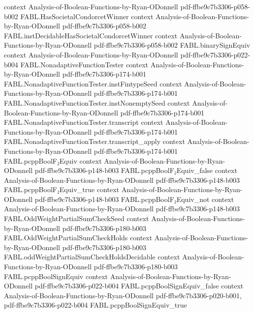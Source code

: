 \begin{theorem}
  {context}
  {Analysis-of-Boolean-Functions-by-Ryan-ODonnell}
  {pdf-ffbe9c7b3306-p058-b002}
\proofstep
  {FABL.HasSocietalCondorcetWinner}
  {context}
  {Analysis-of-Boolean-Functions-by-Ryan-ODonnell}
  {pdf-ffbe9c7b3306-p058-b002}
\proofstep
  {FABL.instDecidableHasSocietalCondorcetWinner}
  {context}
  {Analysis-of-Boolean-Functions-by-Ryan-ODonnell}
  {pdf-ffbe9c7b3306-p058-b002}
\proofstep
  {FABL.binarySignEquiv}
  {context}
  {Analysis-of-Boolean-Functions-by-Ryan-ODonnell}
  {pdf-ffbe9c7b3306-p022-b004}
\proofstep
  {FABL.NonadaptiveFunctionTester}
  {context}
  {Analysis-of-Boolean-Functions-by-Ryan-ODonnell}
  {pdf-ffbe9c7b3306-p174-b001}
\proofstep
  {FABL.NonadaptiveFunctionTester.instFintypeSeed}
  {context}
  {Analysis-of-Boolean-Functions-by-Ryan-ODonnell}
  {pdf-ffbe9c7b3306-p174-b001}
\proofstep
  {FABL.NonadaptiveFunctionTester.instNonemptySeed}
  {context}
  {Analysis-of-Boolean-Functions-by-Ryan-ODonnell}
  {pdf-ffbe9c7b3306-p174-b001}
\proofstep
  {FABL.NonadaptiveFunctionTester.transcript}
  {context}
  {Analysis-of-Boolean-Functions-by-Ryan-ODonnell}
  {pdf-ffbe9c7b3306-p174-b001}
\proofstep
  {FABL.NonadaptiveFunctionTester.transcript_apply}
  {context}
  {Analysis-of-Boolean-Functions-by-Ryan-ODonnell}
  {pdf-ffbe9c7b3306-p174-b001}
\proofstep
  {FABL.pcppBoolF₂Equiv}
  {context}
  {Analysis-of-Boolean-Functions-by-Ryan-ODonnell}
  {pdf-ffbe9c7b3306-p148-b003}
\proofstep
  {FABL.pcppBoolF₂Equiv_false}
  {context}
  {Analysis-of-Boolean-Functions-by-Ryan-ODonnell}
  {pdf-ffbe9c7b3306-p148-b003}
\proofstep
  {FABL.pcppBoolF₂Equiv_true}
  {context}
  {Analysis-of-Boolean-Functions-by-Ryan-ODonnell}
  {pdf-ffbe9c7b3306-p148-b003}
\proofstep
  {FABL.pcppBoolF₂Equiv_not}
  {context}
  {Analysis-of-Boolean-Functions-by-Ryan-ODonnell}
  {pdf-ffbe9c7b3306-p148-b003}
\proofstep
  {FABL.OddWeightPartialSumCheckSeed}
  {context}
  {Analysis-of-Boolean-Functions-by-Ryan-ODonnell}
  {pdf-ffbe9c7b3306-p180-b003}
\proofstep
  {FABL.OddWeightPartialSumCheckHolds}
  {context}
  {Analysis-of-Boolean-Functions-by-Ryan-ODonnell}
  {pdf-ffbe9c7b3306-p180-b003}
\proofstep
  {FABL.oddWeightPartialSumCheckHoldsDecidable}
  {context}
  {Analysis-of-Boolean-Functions-by-Ryan-ODonnell}
  {pdf-ffbe9c7b3306-p180-b003}
\proofstep
  {FABL.pcppBoolSignEquiv}
  {context}
  {Analysis-of-Boolean-Functions-by-Ryan-ODonnell}
  {pdf-ffbe9c7b3306-p022-b004}
\proofstep
  {FABL.pcppBoolSignEquiv_false}
  {context}
  {Analysis-of-Boolean-Functions-by-Ryan-ODonnell}
  {pdf-ffbe9c7b3306-p020-b001,
    pdf-ffbe9c7b3306-p022-b004}
\proofstep
  {FABL.pcppBoolSignEquiv_true}

\end{theorem}
